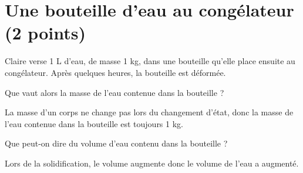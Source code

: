 \section{Une bouteille d'eau au congélateur (2 points)}\label{ex:congel}

Claire verse 1 L d'eau, de masse 1 kg, dans une bouteille qu'elle place ensuite au congélateur. Après quelques heures, la bouteille est déformée.

\begin{questions}
	\question[1] Que vaut alors la masse de l'eau contenue dans la bouteille ?
	\begin{solution}
		La masse d'un corps ne change pas lors du changement d'état, donc la masse de l'eau contenue dans la bouteille est toujours 1 kg.
	\end{solution}
	
	\question[1] Que peut-on dire du volume d'eau contenu dans la bouteille ?
	\begin{solution}
		Lors de la solidification, le volume augmente donc le volume de l'eau a augmenté.
	\end{solution}
\end{questions}